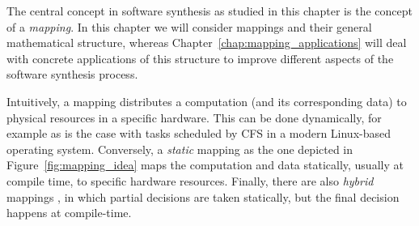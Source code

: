 The central concept in software synthesis as studied in this chapter is the concept of a \emph{mapping}.
In this chapter we will consider mappings and their general mathematical structure, whereas Chapter~\ref{chap:mapping_applications} will deal with concrete applications of this structure to improve different aspects of the software synthesis process.

Intuitively, a mapping distributes a computation (and its corresponding data) to physical resources in a specific hardware.
This can be done dynamically, for example as is the case with tasks scheduled by \acs{CFS} in a modern Linux-based operating system.
Conversely, a \emph{static} mapping as the one depicted in Figure~\ref{fig:mapping_idea} maps the computation and data statically, usually at compile time, to specific hardware resources.
Finally, there are also \emph{hybrid} mappings , in which partial decisions are taken statically, but the final decision happens at compile-time. 
